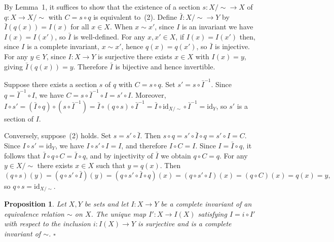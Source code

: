 \documentclass{article}
\makeatletter
\theoremstyle{noperiod}
\newtheorem{proposition}{Proposition}
\renewenvironment{proof}[1][\proofname]{\par
  \pushQED{\qed}
  \normalfont \topsep6\p@\@plus6\p@\relax
  \trivlist
  \item[\hskip\labelsep
        \itshape
    #1 ]\ignorespaces
}{
  \popQED\endtrivlist\@endpefalse
}
\renewcommand{\proofname}{\bfseries Proof}
\makeatother
\begin{document}
\begin{proof}
By Lemma~1, it suffices to show that the existence of a section
$s \colon X/\sim \to X$ of $q \colon X \to X/\sim$ with $C = s \circ q$ is
equivalent to~(2). Define $\bar{I} \colon X/\sim \to Y$ by $\bar{I}(q(x)) = I(x)$
for all $x \in X$. When $x \sim x'$, since $I$ is an invariant we have
$I(x) = I(x')$, so $\bar{I}$ is well-defined. For any $x, x' \in X$, if
$I(x) = I(x')$ then, since $I$ is a complete invariant, $x \sim x'$, hence
$q(x) = q(x')$, so $\bar{I}$ is injective. For any $y \in Y$, since
$I \colon X \to Y$ is surjective there exists $x \in X$ with $I(x) = y$, giving
$\bar{I}(q(x)) = y$. Therefore $\bar{I}$ is bijective and hence invertible.

Suppose there exists a section $s$ of $q$ with $C = s \circ q$. Set
$s' = s \circ \bar{I}^{-1}$. Since $q = \bar{I}^{-1} \circ I$, we have
$C = s \circ \bar{I}^{-1} \circ I = s' \circ I$. Moreover,
$I \circ s' = (\bar{I} \circ q) \circ (s \circ \bar{I}^{-1})
= \bar{I} \circ (q \circ s) \circ \bar{I}^{-1}
= \bar{I} \circ \mathrm{id}_{X/\sim} \circ \bar{I}^{-1}
= \mathrm{id}_Y$,
so $s'$ is a section of $I$.

Conversely, suppose~(2) holds. Set $s = s' \circ \bar{I}$. Then
$s \circ q = s' \circ \bar{I} \circ q = s' \circ I = C$.
Since $I \circ s' = \mathrm{id}_Y$, we have $I \circ s' \circ I = I$,
and therefore $I \circ C = I$.
Since $I = \bar{I} \circ q$, it follows that $\bar{I} \circ q \circ C = \bar{I} \circ q$,
and by injectivity of $\bar{I}$ we obtain $q \circ C = q$.
For any $y \in X/\sim$ there exists $x \in X$ such that $y = q(x)$.
Then
\[
(q \circ s)(y)
= (q \circ s' \circ \bar{I})(y)
= (q \circ s' \circ \bar{I} \circ q)(x)
= (q \circ s' \circ I)(x)
= (q \circ C)(x)
= q(x) = y,
\]
so $q \circ s = \mathrm{id}_{X/\sim}$.
\end{proof}

\begin{proposition}
Let $X, Y$ be sets and let $I \colon X \to Y$ be a complete invariant of an
equivalence relation $\sim$ on $X$. The unique map $I' \colon X \to I(X)$
satisfying $I = i \circ I'$ with respect to the inclusion $i \colon I(X) \to Y$
is surjective and is a complete invariant of $\sim$.
\hfill $\square$
\end{proposition}
\end{document}
